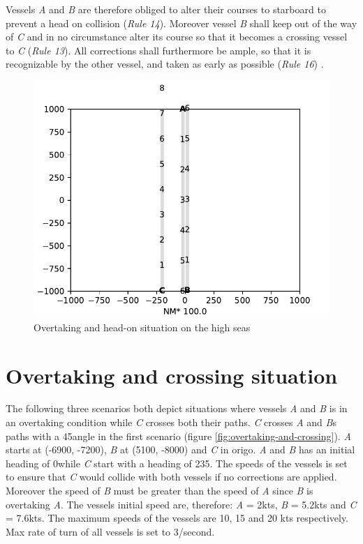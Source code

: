 Vessels \textit{A} and \textit{B} are therefore obliged to alter their courses to starboard to prevent a head on collision (\textit{Rule 14}). Moreover vessel \textit{B} shall keep out of the way of \textit{C}  and in no circumstance alter its course so that it becomes a crossing vessel to \textit{C} (\textit{Rule 13}). All corrections shall furthermore be ample, so that it is recognizable by the other vessel, and taken as early as possible (\textit{Rule 16}) \cite{ecolreg_overtaking-and-head-on}.
\begin{figure}[H]
    \centering
    \includegraphics[width=\textwidth,height=0.75\textheight,keepaspectratio]{Figures/Scenario/overtaking-and-head-on.pdf}
    \caption{Overtaking and head-on situation on the high seas  \cite{ecolreg_overtaking-and-head-on}}
    \label{fig:overtaking-and-head-on}
\end{figure}



\section{Overtaking and crossing situation}
The following three scenarios both depict situations where vessels \textit{A} and \textit{B} is in an overtaking condition while \textit{C} crosses both their paths. \textit{C} crosses \textit{A} and \textit{B}s paths with a 45\textdegree  angle in the first scenario (figure \ref{fig:overtaking-and-crossing}). \textit{A} starts at (-6900, -7200), \textit{B} at (5100, -8000) and \textit{C} in origo. \textit{A} and \textit{B} has an initial heading of 0\textdegree  while \textit{C} start with a heading of 235\textdegree. The speeds of the vessels is set to ensure that \textit{C} would collide with both vessels if no corrections are applied. Moreover the speed of \textit{B} must be greater than the speed of \textit{A} since \textit{B} is overtaking \textit{A}. The vessels initial speed are, therefore: \textit{A} = 2kts, \textit{B} = 5.2kts and \textit{C} = 7.6kts. The maximum speeds of the vessels are 10, 15 and 20 kts respectively. Max rate of turn of all vessels is set to 3\textdegree/second.

